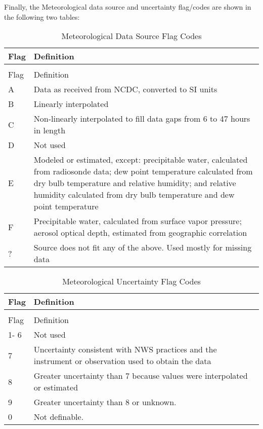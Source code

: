 Finally, the Meteorological data source and uncertainty flag/codes are shown in the following two tables:

\begin{longtable}[c]{p{1.5in}p{4.5in}}
\caption{Meteorological Data Source Flag Codes \label{table:meteorological-data-source-flag-codes}} \tabularnewline
\toprule 
Flag & Definition \tabularnewline
\midrule
\endfirsthead

\caption[]{Meteorological Data Source Flag Codes} \tabularnewline
\toprule 
Flag & Definition \tabularnewline
\midrule
\endhead

A & Data as received from NCDC, converted to SI units \tabularnewline
B & Linearly interpolated \tabularnewline
C & Non-linearly interpolated to fill data gaps from 6 to 47 hours in length \tabularnewline
D & Not used \tabularnewline
E & Modeled or estimated, except: precipitable water, calculated from radiosonde data; dew point temperature calculated from dry bulb temperature and relative humidity; and relative humidity calculated from dry bulb temperature and dew point temperature \tabularnewline
F & Precipitable water, calculated from surface vapor pressure; aerosol optical depth, estimated from geographic correlation \tabularnewline
? & Source does not fit any of the above. Used mostly for missing data \tabularnewline
\bottomrule
\end{longtable}

\begin{longtable}[c]{p{1.5in}p{4.5in}}
\caption{Meteorological Uncertainty Flag Codes \label{table:meteorological-uncertainty-flag-codes}} \tabularnewline
\toprule 
Flag & Definition \tabularnewline
\midrule
\endfirsthead

\caption[]{Meteorological Uncertainty Flag Codes} \tabularnewline
\toprule 
Flag & Definition \tabularnewline
\midrule
\endhead

1- 6 & Not used \tabularnewline
7 & Uncertainty consistent with NWS practices and the instrument or observation used to obtain the data \tabularnewline
8 & Greater uncertainty than 7 because values were interpolated or estimated \tabularnewline
9 & Greater uncertainty than 8 or unknown. \tabularnewline
0 & Not definable. \tabularnewline
\bottomrule
\end{longtable}
